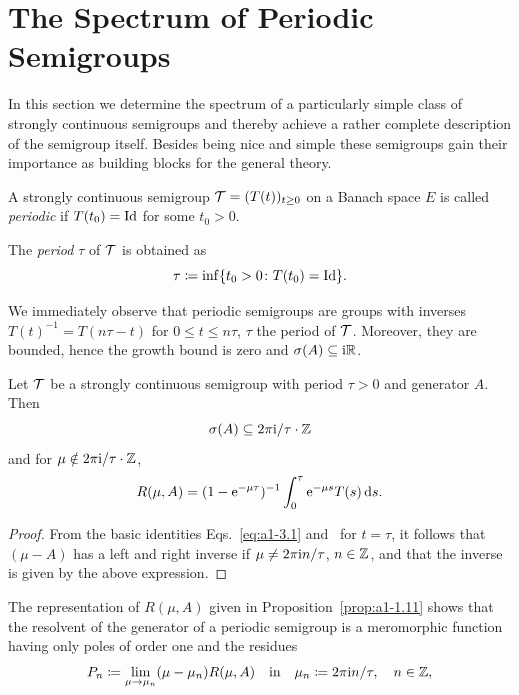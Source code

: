\section{The Spectrum of Periodic Semigroups} \label{sec:a3-5}
In this section we determine the spectrum of a particularly simple class of strongly continuous semigroups and thereby achieve a rather complete description of the semigroup itself.
Besides being nice and simple these semigroups gain their importance as building blocks for the general theory.
\begin{definition}\label{def:a3-5.1}
A strongly continuous semigroup $\TT = (T(t))_{t \geq 0}$ on a Banach space $E$ is called \emph{periodic} if\/ $T(t_{0}) = \operatorname{Id}$ for some $t_{0} > 0$.

The \emph{period} $\tau$ of\/ $\mathcal{T}$ is obtained as 
%
\[
	\tau \coloneq \inf\{t_{0} > 0 \colon T(t_{0}) = \operatorname{Id}\} .
\]
%
\end{definition}
We immediately observe that periodic semigroups are groups with inverses $T(t)^{-1} = T(n\tau-t)$ for $0 \leq t \leq n\tau$, $\tau$ the period of\/ $\mathcal{T}$.
Moreover, they are bounded, hence the growth bound is zero and $\sigma(A) \subseteq \mathrm{i}\mathbb{R}$.
\begin{lemma}\label{lem:a3-5.2}
Let $\mathcal{T}$ be a strongly continuous semigroup with period $\tau > 0$ and generator $A$.
Then
\[
\sigma(A) \subseteq 2\pi \mathrm{i}/\tau\cdot\mathbb{Z}
\]
and for $\mu \notin 2\pi\mathrm{i} /\tau\cdot\mathbb{Z}$,
\begin{equation}\label{eq:a3-5.1}
R(\mu,A) = (1-\mathrm{e}^{-\mu\tau})^{-1} \int_{0}^{\tau}\mathrm{e}^{-\mu s}T(s) \mathop{}\!\mathrm{d}{s} .
\end{equation}
\end{lemma}
\begin{proof}
From the basic identities Eqs.~\eqref{eq:a1-3.1} and~ for $t = \tau$, it follows that $(\mu - A)$ has a left and right inverse if\/ $\mu \neq 2\pi\mathrm{i} n/\tau$, $n \in \mathbb{Z}$, and that the inverse is given by the above expression.
\end{proof}
The representation of\/ $R(\mu,A)$ given in Proposition~\ref{prop:a1-1.11} shows that the resolvent of the generator of a periodic semigroup is a meromorphic function having only poles of order one and the residues
\[
P_{n} \coloneq \lim_{\mu \to \mu_{n}} (\mu-\mu_{n})R(\mu,A) \quad \text{in} \quad \mu_{n} \coloneq 2\pi\mathrm{i} n/\tau, \quad n \in \mathbb{Z} ,
\]
